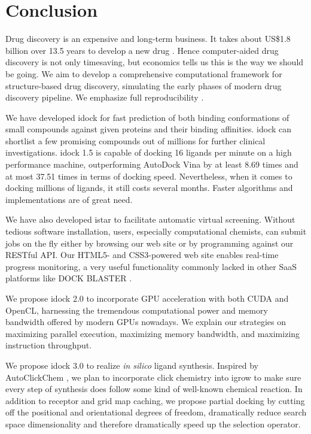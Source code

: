\chapter{Conclusion}

Drug discovery is an expensive and long-term business. It takes about US\$1.8 billion over 13.5 years to develop a new drug \citep{716}. Hence computer-aided drug discovery is not only timesaving, but economics tells us this is the way we should be going. We aim to develop a comprehensive computational framework for structure-based drug discovery, simulating the early phases of modern drug discovery pipeline. We emphasize full reproducibility \citep{965}.

We have developed idock for fast prediction of both binding conformations of small compounds against given proteins and their binding affinities. idock can shortlist a few promising compounds out of millions for further clinical investigations. idock 1.5 is capable of docking 16 ligands per minute on a high performance machine, outperforming AutoDock Vina \citep{595} by at least 8.69 times and at most 37.51 times in terms of docking speed. Nevertheless, when it comes to docking millions of ligands, it still costs several months. Faster algorithms and implementations are of great need.

We have also developed istar to facilitate automatic virtual screening. Without tedious software installation, users, especially computational chemists, can submit jobs on the fly either by browsing our web site or by programming against our RESTful API. Our HTML5- and CSS3-powered web site enables real-time progress monitoring, a very useful functionality commonly lacked in other SaaS platforms like DOCK BLASTER \citep{557}.

We propose idock 2.0 to incorporate GPU acceleration with both CUDA and OpenCL, harnessing the tremendous computational power and memory bandwidth offered by modern GPUs nowadays. We explain our strategies on maximizing parallel execution, maximizing memory bandwidth, and maximizing instruction throughput.

We propose idock 3.0 to realize \textit{in silico} ligand synthesis. Inspired by AutoClickChem \citep{1051}, we plan to incorporate click chemistry into igrow to make sure every step of synthesis does follow some kind of well-known chemical reaction. In addition to receptor and grid map caching, we propose partial docking by cutting off the positional and orientational degrees of freedom, dramatically reduce search space dimensionality and therefore dramatically speed up the selection operator.

